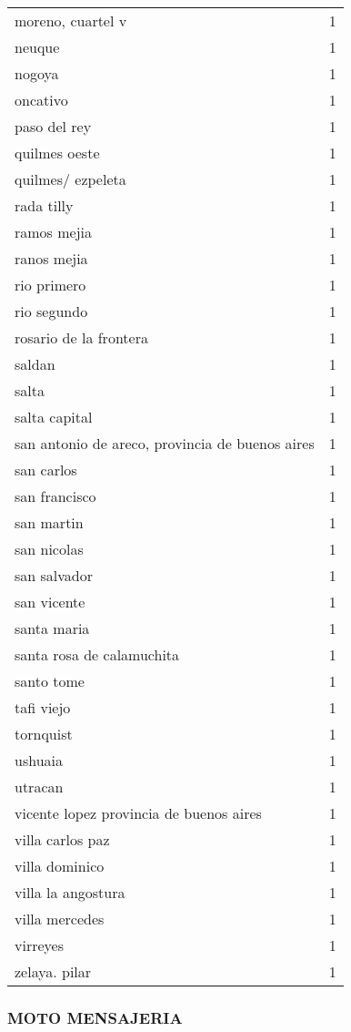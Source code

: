 \documentclass[
]{article}
\begin{document}
\begin{longtable}[t]{lr}
\addlinespace
moreno, cuartel v & 1\\
neuque & 1\\
nogoya & 1\\
oncativo & 1\\
paso del rey & 1\\
\addlinespace
quilmes oeste & 1\\
quilmes/ ezpeleta & 1\\
rada tilly & 1\\
ramos mejia & 1\\
ranos mejia & 1\\
\addlinespace
rio primero & 1\\
rio segundo & 1\\
rosario de la frontera & 1\\
saldan & 1\\
salta & 1\\
\addlinespace
salta capital & 1\\
san antonio de areco, provincia de buenos aires & 1\\
san carlos & 1\\
san francisco & 1\\
san martin & 1\\
\addlinespace
san nicolas & 1\\
san salvador & 1\\
san vicente & 1\\
santa maria & 1\\
santa rosa de calamuchita & 1\\
\addlinespace
santo tome & 1\\
tafi viejo & 1\\
tornquist & 1\\
ushuaia & 1\\
utracan & 1\\
\addlinespace
vicente lopez provincia de buenos aires & 1\\
villa carlos paz & 1\\
villa dominico & 1\\
villa la angostura & 1\\
villa mercedes & 1\\
\addlinespace
virreyes & 1\\
zelaya. pilar & 1\\
\bottomrule
\end{longtable}

\hypertarget{moto-mensajeria}{%
\subsubsection{MOTO MENSAJERIA}\label{moto-mensajeria}}
\end{document}
